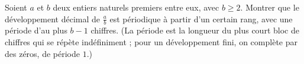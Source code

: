 Soient $a$ et $b$ deux entiers naturels premiers entre eux, avec $b \geq 2$.
Montrer que le développement décimal de $\frac{a}{b}$ est périodique à partir
d'un certain rang, avec une période d'au plus $b - 1$ chiffres. (La période
est la longueur du plus court bloc de chiffres qui se répète indéfiniment ;
pour un développement fini, on complète par des zéros, de période $1$.)
